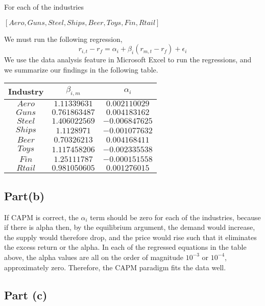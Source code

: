 \documentclass[12pt]{article}
\begin{document}
		For each of the industries
		\begin{center}
			$[Aero, Guns, Steel, Ships, Beer, Toys, Fin, Rtail]$
		\end{center}
		We must run the following regression,
		$$ r_{i,t} - r_{f} = \alpha_{i} + \beta_{i}(r_{m,t} - r_{f}) + \epsilon_{i} $$
		We use the data analysis feature in Microsoft Excel to run the regressions, and we summarize our findings in the following table. 
		\begin{center}
 		\begin{tabular}{||c c c||} 
 		\hline
 		 Industry &  $\beta_{i,m}$ & $\alpha_{i}$ \\ [0.5ex] 
 		\hline \hline
 		$Aero$ & $1.11339631$ & $0.002110029$  \\ 
 		\hline
 		$Guns$ & $0.761863487$ & $0.004183162$ \\
 		\hline
 		$Steel$ & $1.406022569$  & $-0.006847625$  \\
 		\hline
 		$Ships$ & $1.1128971$ & $-0.001077632$  \\
 		\hline
 		$Beer$ & $0.70326213$ & $0.004168411$  \\
 		\hline
 		$Toys$ & $1.117458206$ & $-0.002335538$ \\
 		\hline
 		$Fin$ & $1.25111787$ & $-0.000151558$ \\
 		\hline
 		$Rtail$ & $0.981050605$ & $0.001276015$ \\ 
 		\hline
		\end{tabular}
		\end{center}
		
	\subsection{Part(b)}
	
		If CAPM is correct, the $\alpha_{i}$ term should be zero for each of the industries, because if there is alpha then, by the equilibrium argument, the 
		demand would increase, the supply would therefore drop, and the price would rise such that it eliminates the excess return or the alpha. In each of the 
		regressed equations in the table above, the alpha values are all on the order of magnitude $10^{-3}$ or $10^{-4}$, approximately zero. Therefore, 
		the CAPM paradigm fits the data well. 
	\subsection{Part (c)}
	
\end{document}
